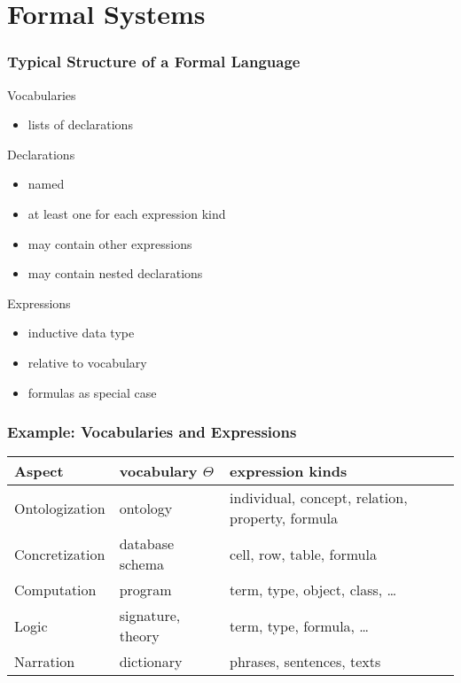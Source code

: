 \section{Formal Systems}

\begin{frame}\frametitle{Typical Structure of a Formal Language}
Vocabularies
\begin{itemize}
\item lists of declarations
\end{itemize}

Declarations
\begin{itemize}
\item named
\item at least one for each expression kind
\item may contain other expressions 
\item may contain nested declarations 
\end{itemize}

Expressions
\begin{itemize}
\item inductive data type
\item relative to vocabulary 
\item formulas as special case
\end{itemize}
\end{frame}

\begin{frame}\frametitle{Example: Vocabularies and Expressions}
\begin{center}
\footnotesize
\begin{tabular}{l|ll}
Aspect & vocabulary $\Theta$ & expression kinds \\
\hline
Ontologization  & ontology & individual, concept, relation, property, formula \\
Concretization & database schema & cell, row, table, formula \\
Computation & program & term, type, object, class, \ldots \\
Logic & signature, theory & term, type, formula, \ldots \\
Narration & dictionary & phrases, sentences, texts \\
\end{tabular}
\end{center}
\end{frame}


